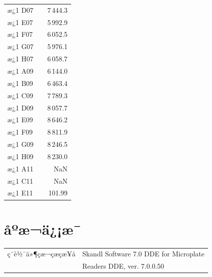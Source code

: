 \documentclass[UTF8,10pt,a4paper,fontset=fandol]{ctexart}
\newcommand{\fieldvalue}[1]{#1}
\begin{document}
\begin{tabular}{llr}
æ¿1 D07 & & %
\fieldvalue{7\,444.3}\\
æ¿1 E07 & & %
\fieldvalue{5\,992.9}\\
æ¿1 F07 & & %
\fieldvalue{6\,052.5}\\
æ¿1 G07 & & %
\fieldvalue{5\,976.1}\\
æ¿1 H07 & & %
\fieldvalue{6\,058.7}\\
æ¿1 A09 & & %
\fieldvalue{6\,144.0}\\
æ¿1 B09 & & %
\fieldvalue{6\,463.4}\\
æ¿1 C09 & & %
\fieldvalue{7\,789.3}\\
æ¿1 D09 & & %
\fieldvalue{8\,057.7}\\
æ¿1 E09 & & %
\fieldvalue{8\,646.2}\\
æ¿1 F09 & & %
\fieldvalue{8\,811.9}\\
æ¿1 G09 & & %
\fieldvalue{8\,246.5}\\
æ¿1 H09 & & %
\fieldvalue{8\,230.0}\\
æ¿1 A11 & & %
\fieldvalue{NaN}\\
æ¿1 C11 & & %
\fieldvalue{NaN}\\
æ¿1 E11 & & %
\fieldvalue{101.99}
\end{tabular}

\section*{åºæ¬ä¿¡æ¯}

\begin{tabular}{ll}
ç¨è½¯ä»¶çæ¬çæçæ¥å &
\fieldvalue{Skandl Software 7.0 DDE for Microplate}\\
& \fieldvalue{Readers DDE, ver. 7.0.0.50}
\end{tabular}
\end{document}

